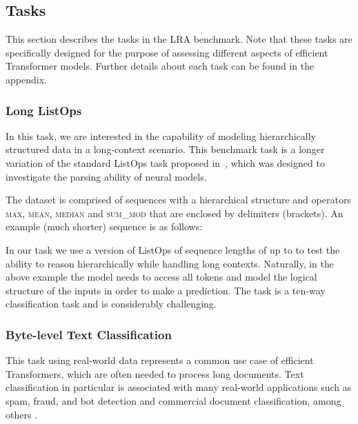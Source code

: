 \documentclass{article} \usepackage{iclr2021_conference,times}
\begin{document}
\subsection{Tasks}


This section describes the tasks in the LRA benchmark. Note that these tasks are specifically designed for the purpose of assessing different aspects of efficient Transformer models. Further details about each task can be found in the appendix.

      \subsubsection{Long ListOps} 
      In this task, we are interested in the capability of modeling hierarchically structured data in a long-context scenario. This benchmark task is a longer variation of the standard ListOps task proposed in~\citep{nangia2018listops}, which was designed to investigate the parsing ability of neural models. 
      
      The dataset is comprised of sequences with a hierarchical structure and operators \textsc{max}, \textsc{mean}, \textsc{median} and \textsc{sum\_mod} that are enclosed by delimiters (brackets). An example (much shorter) sequence is as follows:
      
      \begin{minipage}{\textwidth}
      \end{minipage}
      
      In our task we use a version of ListOps of sequence lengths of up to  to test the ability to reason hierarchically while handling long contexts. Naturally, in the above example the model needs to access all tokens and model the logical structure of the inputs in order to make a prediction. The task is a ten-way classification task and is considerably challenging. 
      
    \subsubsection{Byte-level Text Classification} This task using real-world data represents a common use case of efficient Transformers, which are often needed to process long documents. Text classification in particular is associated with many real-world applications such as spam, fraud, and bot detection and commercial document classification, among others \citep{Howard2018}.
    
\end{document}
